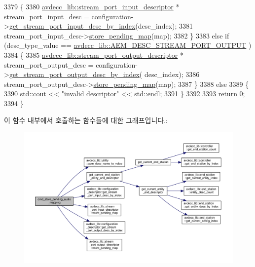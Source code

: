 \begin{DoxyCode}
3379     \{
3380         \hyperlink{classavdecc__lib_1_1stream__port__input__descriptor}{avdecc\_lib::stream\_port\_input\_descriptor} * 
      stream\_port\_input\_desc = configuration->\hyperlink{classavdecc__lib_1_1configuration__descriptor_ad05646251e84a4024f317dd82395b8f7}{get\_stream\_port\_input\_desc\_by\_index}(desc\_index);
3381         stream\_port\_input\_desc->\hyperlink{classavdecc__lib_1_1stream__port__input__descriptor_ac1774e84412c74378819f20d257a7653}{store\_pending\_map}(map);
3382     \}
3383     \textcolor{keywordflow}{else} \textcolor{keywordflow}{if} (desc\_type\_value == \hyperlink{namespaceavdecc__lib_ac7b7d227e46bc72b63ee9e9aae15902fa2b2dca37bb2c945a2b37b02231650b48}{avdecc\_lib::AEM\_DESC\_STREAM\_PORT\_OUTPUT}
      )
3384     \{
3385         \hyperlink{classavdecc__lib_1_1stream__port__output__descriptor}{avdecc\_lib::stream\_port\_output\_descriptor} * 
      stream\_port\_output\_desc = configuration->\hyperlink{classavdecc__lib_1_1configuration__descriptor_afc0e79843f9b98263f9be9d16197310b}{get\_stream\_port\_output\_desc\_by\_index}(
      desc\_index);
3386         stream\_port\_output\_desc->\hyperlink{classavdecc__lib_1_1stream__port__output__descriptor_ac1774e84412c74378819f20d257a7653}{store\_pending\_map}(map);
3387     \}
3388     \textcolor{keywordflow}{else}
3389     \{
3390         std::cout << \textcolor{stringliteral}{"invalid descriptor"} << std::endl;
3391     \}
3392 
3393     \textcolor{keywordflow}{return} 0;
3394 \}
\end{DoxyCode}


이 함수 내부에서 호출하는 함수들에 대한 그래프입니다.\+:
\nopagebreak
\begin{figure}[H]
\begin{center}
\leavevmode
\includegraphics[width=350pt]{classcmd__line_a6441ee5267b15302307a0996c251da4e_cgraph}
\end{center}
\end{figure}




